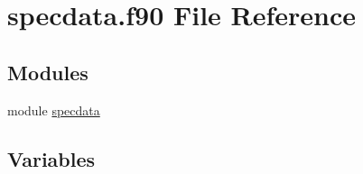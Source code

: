 \hypertarget{specdata_8f90}{
\section{specdata.f90 File Reference}
\label{specdata_8f90}
}
\subsection*{Modules}
\begin{DoxyCompactItemize}
\item 
module \hyperlink{namespacespecdata}{specdata}
\end{DoxyCompactItemize}
\subsection*{Variables}
